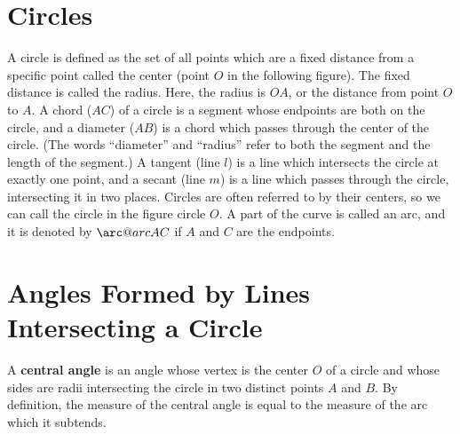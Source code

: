 \documentclass{article}
\makeatletter
\newcommand{\arc@char}{{\usefont{U}{tipa}{m}{n}\symbol{62}}}%
\newcommand{\arc}[1]{\mathpalette\arc@arc{#1}}
\newcommand{\arc@arc}[2]{%
	\sbox0{$\m@th#1#2$}%
	\vbox{
		\hbox{\resizebox{\wd0}{\height}{\arc@char}}
		\nointerlineskip
		\box0
	}%
}
\makeatother
\begin{document}
\begin{multicols}{2}
	\section*{Circles}
	A circle is defined as the set of all points which are a fixed distance from a specific point called the center (point $O$ in the following figure).
	The fixed distance is called the radius.
	Here, the radius is $OA$, or the distance from point $O$ to $A$.
	A chord ($AC$) of a circle is a segment whose endpoints are both on the circle, and a diameter ($AB$) is a chord which passes through the center of the circle.
	(The words ``diameter'' and ``radius'' refer to both the segment and the length of the segment.)
	A tangent (line $l$) is a line which intersects the circle at exactly one point, and a secant (line $m$) is a line which passes through the circle, intersecting it in two places.
	Circles are often referred to by their centers, so we can call the circle in the figure circle $O$.
	A part of the curve is called an arc, and it is denoted by $\arc{AC}$ if $A$ and $C$ are the endpoints.
	\begin{center}
	\end{center}

	\section*{Angles Formed by Lines Intersecting a Circle}
	A \textbf{central angle} is an angle whose vertex is the center $O$ of a circle and whose sides are radii intersecting the circle in two distinct points $A$ and $B$.
	By definition, the measure of the central angle is equal to the measure of the arc which it subtends.
	\begin{center}
	\end{center}


\end{multicols}
\end{document}
